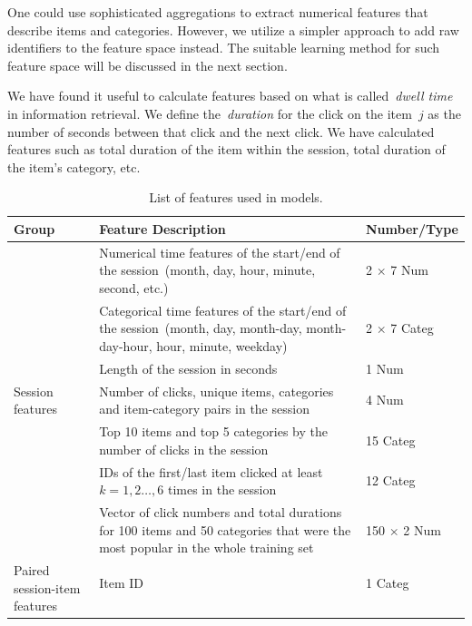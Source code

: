 \documentclass{sig-alternate}
\begin{document}
One could use sophisticated aggregations to extract numerical features that describe items and categories.
However, we utilize a simpler approach to add raw identifiers to the feature space instead.
The suitable learning method for such feature space will be discussed in the next section.

We have found it useful to calculate features based on what
is called~\emph{dwell time}~\cite{yi2014beyond} in information retrieval.
We define the~\emph{duration} for the click on the item~$j$
as the number of seconds between that click and the next click.
We have calculated features such as total duration of the item within the session,
total duration of the item's category, etc.

\begin{table}
    \caption{List of features used in models.}
    \label{tab:features}
    \medskip
    \centering
    \begin{tabular}{|m{2cm}|p{12cm}|m{2.5cm}|}
        \hline
        \bfseries{Group} & \bfseries{Feature Description} & \bfseries{Number/Type} \\
        \hline
        \hline %
        \multirow{7}{*}{\parbox{2cm}{\centering Session features}}
            & Numerical time features of the start/end of the session~(month, day, hour, minute, second, etc.)
            & 2 $\times$ 7 Num \\ \cline{2-3}
        & Categorical time features of the start/end of the session~(month, day, month-day, month-day-hour, hour, minute, weekday)
            & 2 $\times$ 7 Categ \\ \cline{2-3}
        & Length of the session in seconds & 1 Num \\ \cline{2-3}
        & Number of clicks, unique items, categories and item-category pairs in the session & 4 Num \\ \cline{2-3}
        & Top 10 items and top 5 categories by the number of clicks in the session & 15 Categ \\ \cline{2-3}
        & IDs of the first/last item clicked at least $k=1,2\dots,6$ times in the session & 12 Categ \\ \cline{2-3}
        & Vector of click numbers and total durations for 100 items and 50 categories that were the most popular in the whole training set
            & 150 $\times$ 2 Num \\ \hline
        \hline %
        \multirow{8}{*}{\parbox{2cm}{\centering Paired session-item features}}
            & Item ID & 1 Categ \\ \cline{2-3}

\end{tabular}
\end{table}
\end{document}
